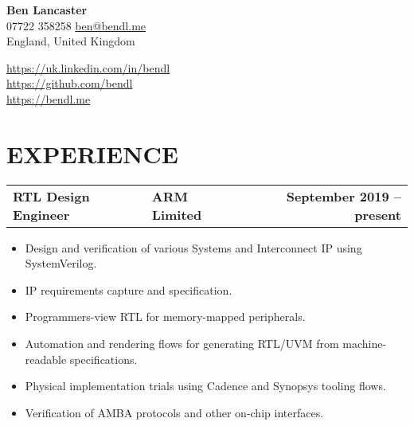 \documentclass[letterpaper,11pt]{article}
\newcommand{\resumeItem}[1]{
  \item\small{
    {#1 \vspace{-5pt}}
  }
}
\newcommand{\resumeSubheading}[3]{
    \begin{center}
    \begin{tabularx}{1\textwidth}{XP{9.4cm}r}
      \small\textbf{#1} & \textbf{#2} & \textbf{#3}
    \end{tabularx}\vspace{-7pt}
    \end{center}
}
\newcommand{\resumeItemListStart}{\begin{itemize}[label={\large\textbullet}]}
\newcommand{\resumeItemListEnd}{\end{itemize}\vspace{10pt}}
\begin{document}

\iffalse
\begin{center}
    \textbf{\Huge \scshape Ben Lancaster} \\ \vspace{5pt}
    \small (+44) 07722 358258 $|$ \href{mailto:ben@bendl.me}{\underline{ben@bendl.me}} $|$ 
    \href{https://uk.linkedin.com/in/bendl}{\underline{uk.linkedin.com/in/bendl}} $|$
    \href{https://github.com/bendl}{\underline{github.com/bendl}}
\end{center}
\fi

\begin{minipage}{4in}
    \textbf{\Huge Ben Lancaster}\\
    07722 358258 \href{mailto:ben@bendl.me}{ben@bendl.me}\\
    England, United Kingdom
\end{minipage}
    \hfill
\begin{minipage}{3in}
\begin{flushright}
    \href{https://uk.linkedin.com/in/bendl}{https://uk.linkedin.com/in/bendl}\\
    \href{https://github.com/bendl}{https://github.com/bendl}  \\
    \href{https://bendl.me}{https://bendl.me}
\end{flushright}
\end{minipage}
\vspace{15pt}

\section{EXPERIENCE}
    \begin{tabularx}{1\textwidth}{p{8cm}Xr}
      \small\textbf{RTL Design Engineer} & \small\textbf{ARM Limited} & \small\textbf{September 2019 -- present}
    \end{tabularx}\vspace{-3pt}
    \resumeItemListStart
        \resumeItem{Design and verification of various Systems and Interconnect IP using SystemVerilog.}
        \resumeItem{IP requirements capture and specification.}
        \resumeItem{Programmers-view RTL for memory-mapped peripherals.}
        \resumeItem{Automation and rendering flows for generating RTL/UVM from machine-readable specifications.}
        \resumeItem{Physical implementation trials using Cadence and Synopsys tooling flows.}
        \resumeItem{Verification of AMBA protocols and other on-chip interfaces.}
    \resumeItemListEnd
\end{document}
